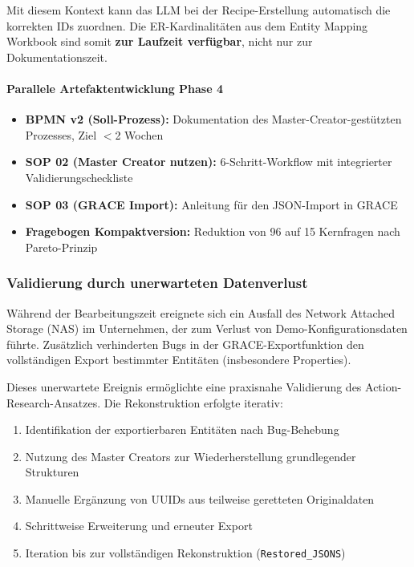 Mit diesem Kontext kann das LLM bei der Recipe-Erstellung automatisch die korrekten IDs zuordnen. Die ER-Kardinalitäten aus dem Entity Mapping Workbook sind somit \textbf{zur Laufzeit verfügbar}, nicht nur zur Dokumentationszeit.

\paragraph{Parallele Artefaktentwicklung Phase 4}

\begin{itemize}
    \item \textbf{BPMN v2 (Soll-Prozess):} Dokumentation des Master-Creator-gestützten Prozesses, Ziel $<$2 Wochen
    \item \textbf{SOP 02 (Master Creator nutzen):} 6-Schritt-Workflow mit integrierter Validierungscheckliste
    \item \textbf{SOP 03 (GRACE Import):} Anleitung für den JSON-Import in GRACE
    \item \textbf{Fragebogen Kompaktversion:} Reduktion von 96 auf 15 Kernfragen nach Pareto-Prinzip
\end{itemize}


\subsubsection{Validierung durch unerwarteten Datenverlust}
\label{subsubsec:NASCrashValidierung}

Während der Bearbeitungszeit ereignete sich ein Ausfall des Network Attached Storage (NAS) im Unternehmen, der zum Verlust von Demo-Konfigurationsdaten führte. Zusätzlich verhinderten Bugs in der GRACE-Exportfunktion den vollständigen Export bestimmter Entitäten (insbesondere Properties).

Dieses unerwartete Ereignis ermöglichte eine praxisnahe Validierung des Action-Research-Ansatzes. Die Rekonstruktion erfolgte iterativ:

\begin{enumerate}
    \item Identifikation der exportierbaren Entitäten nach Bug-Behebung
    \item Nutzung des Master Creators zur Wiederherstellung grundlegender Strukturen
    \item Manuelle Ergänzung von UUIDs aus teilweise geretteten Originaldaten
    \item Schrittweise Erweiterung und erneuter Export
    \item Iteration bis zur vollständigen Rekonstruktion (\texttt{Restored\_JSONS})
\end{enumerate}

